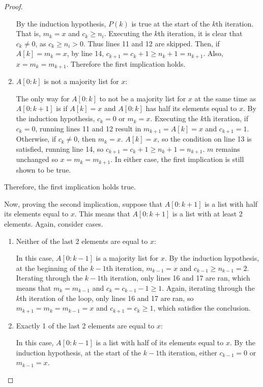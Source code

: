 \documentclass[11pt]{article}
\begin{document}
\begin{proof}
\begin{enumerate}
            By the induction hypothesis, \(P(k)\) is true at the start of the \(k\)th iteration. That is, \(m_k = x\) and \(c_k \geq n_i\). Executing the \(k\)th iteration, it is clear that \(c_k \neq 0\), as \(c_k \geq n_i > 0\). Thus lines 11 and 12 are skipped. Then, if \(A[k]=m_k = x\), by line 14, \(c_{k+1} = c_k + 1 \geq n_k + 1 = n_{k+1}\). Also, \(x=m_k=m_{k+1}\). Therefore the first implication holds.

            \item \(A[0:k]\) is not a majority list for \(x\):
            
            The only way for \(A[0:k]\) to not be a majority list for \(x\) at the same time as \(A[0:k+1]\) is if \(A[k]=x\) and \(A[0:k]\) has half its elements equal to \(x\). By the induction hypothesis, \(c_k = 0\) or \(m_k=x\). Executing the \(k\)th iteration, if \(c_k=0\), running lines 11 and 12 result in \(m_{k+1} = A[k] = x\) and \(c_{k+1} = 1\). Otherwise, if \(c_k \neq 0\), then \(m_k=x\). \(A[k]=x\), so the condition on line 13 is satisfied, running line 14, so \(c_{k+1} = c_k + 1 \geq n_k + 1 = n_{k+1}\). \(m\) remains unchanged so \(x=m_k=m_{k+1}\). In either case, the first implication is still shown to be true.
        \end{enumerate}
        Therefore, the first implication holds true.

        Now, proving the second implication, suppose that \(A[0:k+1]\) is a list with half its elements equal to \(x\). This means that \(A[0:k+1]\) is a list with at least 2 elements. Again, consider cases.
        \begin{enumerate}
            \item Neither of the last 2 elements are equal to \(x\):
            
            In this case, \(A[0:k-1]\) is a majority list for \(x\). By the induction hypothesis, at the beginning of the \(k-1\)th iteration, \(m_{k-1} = x\) and \(c_{k-1} \geq n_{k-1} = 2\). Iterating through the \(k-1\)th iteration, only lines 16 and 17 are ran, which means that \(m_k = m_{k-1}\) and \(c_k = c_{k-1} - 1 \geq 1\). Again, iterating through the \(k\)th iteration of the loop, only lines 16 and 17 are ran, so \(m_{k+1} = m_k = m_{k-1} = x\) and \(c_{k+1} = c_k \geq 1\), which satisfies the conclusion.
            
            \item Exactly 1 of the last 2 elements are equal to \(x\):
            
            In this case, \(A[0:k-1]\) is a list with half of its elements equal to \(x\). By the induction hypothesis, at the start of the \(k-1\)th iteration, either \(c_{k-1} = 0\) or \(m_{k-1} = x\).
            

\end{enumerate}
\end{proof}
\end{document}
